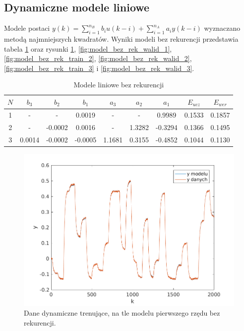 \documentclass{article}
\begin{document}
\subsection{Dynamiczne modele liniowe}
Modele postaci $ y(k) = \sum_{i=1}^{n_B}b_i u(k-i) + \sum_{i = 1}^{n_A}a_i y(k-i)$ wyznaczano metodą najmniejszych kwadratów. Wyniki modeli bez rekurencji przedstawia tabela \ref{tab:bez_rek} oraz rysunki \ref{fig:model_bez_rek_train_1}, \ref{fig:model_bez_rek_walid_1}, \ref{fig:model_bez_rek_train_2}, \ref{fig:model_bez_rek_walid_2}, \ref{fig:model_bez_rek_train_3} i \ref{fig:model_bez_rek_walid_3}.
\begin{table}
	\begin{tabular}{|c|c|c|c|c|c|c|c|c|}
		\hline 
		$N$ & $b_3$ & $b_2$ & $b_1$ & $a_3$ & $a_2$ & $a_1$ & $E_{ucz}$ & $E_{wer}$ \\ 
		\hline 
		1 & - & - & 0.0019 & - & - & 0.9989 & 0.1533 & 0.1857 \\ 
		\hline 
		2 & - & -0.0002 & 0.0016 & - & 1.3282 & -0.3294 & 0.1366 & 0.1495 \\ 
		\hline 
		3 & 0.0014 & -0.0002 & -0.0005  & 1.1681  & 0.3155 & -0.4852 & 0.1044 & 0.1130 \\ 
		\hline 
	\end{tabular}
	\label{tab:bez_rek}
	\caption{Modele liniowe bez rekurencji}
\end{table}

\begin{figure}
	\centering
	\includegraphics[width=0.7\linewidth]{../dane_dynamiczne/model_bez_rek_train_1}
	\caption{Dane dynamiczne trenujące, na tle modelu pierwszego rzędu bez rekurencji.}
	\label{fig:model_bez_rek_train_1}
\end{figure}
\end{document}
